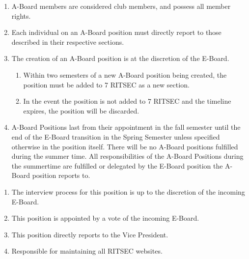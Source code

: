 

\begin{enumerate}
      \item A-Board members are considered club members, and possess all member rights.     
      \item Each individual on an A-Board position must directly report to those described
            in their respective sections.
      \item The creation of an A-Board position is at the discretion of the E-Board.
            \begin{enumerate}
                  \item Within two semesters of a new A-Board position being created, the position must
                        be added to 7 RITSEC as a new section.
                  \item In the event the position is not added to 7 RITSEC and the timeline expires,
                        the position will be discarded.
            \end{enumerate}
      \item A-Board Positions last from their appointment in the fall semester until the end of the E-Board transition in the Spring Semester unless specified otherwise in the position itself. There will be no A-Board positions fulfilled during the summer time. All responsibilities of the A-Board Positions during the summertime are fulfilled or delegated by the E-Board position the A-Board position reports to.

\end{enumerate}


\begin{enumerate}
      \item The interview process for this position is up to the discretion of the incoming
            E-Board.
      \item This position is appointed by a vote of the incoming E-Board.
      \item This position directly reports to the Vice President.
      \item Responsible for maintaining all RITSEC websites.
\end{enumerate}

